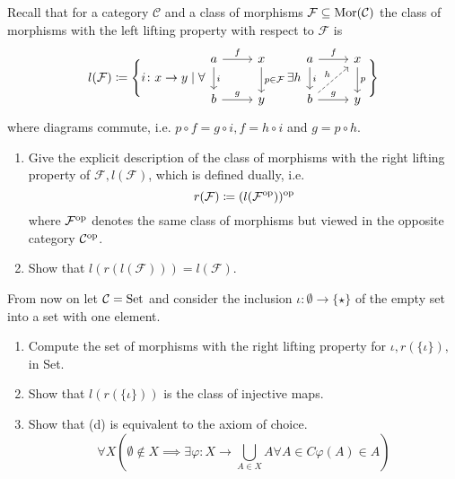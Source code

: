 \begin{Exercise}
    Recall that for a category $ \mathcal{ C } $ and a class of morphisms $ \mathcal{ F } \subseteq \operatorname{Mor} ( \mathcal{ C } )$ the class of morphisms with the left lifting property with respect to $ \mathcal{ F } $ is 
    \[
        l ( \mathcal{ F } )
        \coloneqq  
        \Bigg\{ i \colon x \to y \mid \forall \begin{tikzcd}
            a 
            \ar[r, "f"]
            \ar[d, "i"]
            &
            x
            \ar[d, "p \in \mathcal{ F }"]
            \\
            b
            \ar[r, "g"]
            &
            y
        \end{tikzcd}
        \exists h
        \begin{tikzcd}
            a 
            \ar[r, "f"]
            \ar[d, "i"]
            &
            x
            \ar[d, "p "]
            \\
            b
            \ar[r, "g"]
            \ar[ru, dashed, "h"]
            &
            y
        \end{tikzcd}
        \Bigg\}
    \]
    where diagrams commute, i.e. $ p \circ f = g \circ i , f = h \circ i $ and $ g = p \circ h $.
    \begin{enumerate}[label=(\alph*)]
        \item 
        Give the explicit description of the class of morphisms with the right lifting property of $ \mathcal{ F } , l ( \mathcal{ F } )$, which is defined dually, i.e.
        \[
            r ( \mathcal{ F } ) \coloneqq ( l ( \mathcal{ F^{\operatorname{op}} } ) )^{\operatorname{op}}
        \]
        where $\mathcal{ F }^{\operatorname{op}} $ denotes the same class of morphisms but viewed in the opposite category $ \mathcal{ C }^{\operatorname{op}}$.
    
        \item 
        Show that $ l ( r ( l ( \mathcal{ F } ) ) ) = l ( \mathcal{ F } ) $.
    
    \end{enumerate}
    
    From now on let $ \mathcal{ C } = \operatorname{Set} $ and consider the inclusion $ \iota : \emptyset \to \{ \star \} $ of the empty set into a set with one element.
    
    \begin{enumerate}[label=(\alph*), resume]
        \item 
        Compute the set of morphisms with the right lifting property for $ \iota, r ( \{ \iota \} ), $ in Set.
    
        \item 
        Show that $ l ( r ( \{ \iota \} ) ) $ is the class of injective maps.
    
        \item 
        Show that (d) is equivalent to the axiom of choice.
        \[
            \forall  X ( \emptyset \notin X \implies \exists \varphi \colon X  \to \bigcup_{ A \in X } A 
            \forall A \in C \varphi( A ) \in A )    
        \]
    \end{enumerate}
\end{Exercise}

